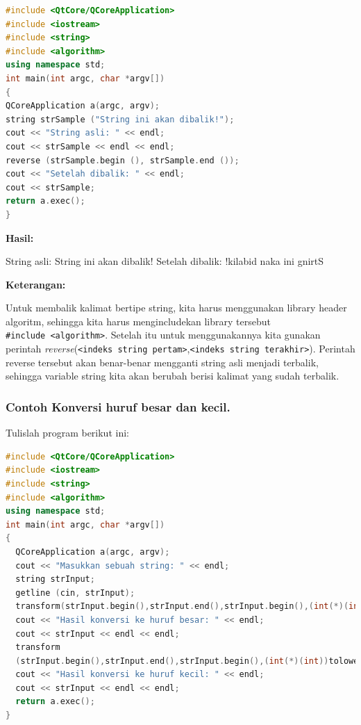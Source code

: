 \begin{lstlisting}[language=c++, caption=Membalik kata / kalimat, label=contoh3-30]
#include <QtCore/QCoreApplication>
#include <iostream>
#include <string>
#include <algorithm>
using namespace std;
int main(int argc, char *argv[])
{
QCoreApplication a(argc, argv);
string strSample ("String ini akan dibalik!");
cout << "String asli: " << endl;
cout << strSample << endl << endl;
reverse (strSample.begin (), strSample.end ());
cout << "Setelah dibalik: " << endl;
cout << strSample;
return a.exec();
}
\end{lstlisting}

\textbf{Hasil:}

\begin{lcverbatim}
String asli:
String ini akan dibalik!
Setelah dibalik:
!kilabid naka ini gnirtS
\end{lcverbatim}

\textbf{Keterangan:}

Untuk membalik kalimat bertipe string, kita harus menggunakan library
header algoritm, sehingga kita harus mengincludekan library tersebut
\texttt{\#include\ \textless{}algorithm\textgreater{}}. Setelah itu
untuk menggunakannya kita gunakan perintah
\emph{reverse}(\texttt{\textless{}indeks\ string\ pertam\textgreater{}},\texttt{\textless{}indeks\ string\ terakhir\textgreater{}}).
Perintah reverse tersebut akan benar-benar mengganti string asli menjadi
terbalik, sehingga variable string kita akan berubah berisi kalimat yang
sudah terbalik.

\subsubsection*{Contoh  Konversi huruf besar dan kecil.}

Tulislah program berikut ini:

\begin{lstlisting}[language=c++, caption=Konversi huruf besar dan kecil, label=contoh3-31]
#include <QtCore/QCoreApplication>
#include <iostream>
#include <string>
#include <algorithm>
using namespace std;
int main(int argc, char *argv[])
{
  QCoreApplication a(argc, argv);
  cout << "Masukkan sebuah string: " << endl;
  string strInput;
  getline (cin, strInput);
  transform(strInput.begin(),strInput.end(),strInput.begin(),(int(*)(int))toupper);
  cout << "Hasil konversi ke huruf besar: " << endl;
  cout << strInput << endl << endl;
  transform
  (strInput.begin(),strInput.end(),strInput.begin(),(int(*)(int))tolower);
  cout << "Hasil konversi ke huruf kecil: " << endl;
  cout << strInput << endl << endl;
  return a.exec();
}
\end{lstlisting}

